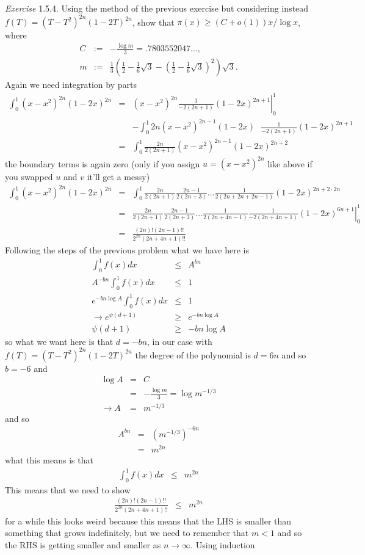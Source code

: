 \documentclass[aps,preprint,preprintnumbers,nofootinbib,showpacs,prd]{revtex4-1}
\newcommand{\nbea}{\begin{eqnarray*}}
\newcommand{\neea}{\end{eqnarray*}}
\begin{document}
{\it Exercise} 1.5.4. Using the method of the previous exercise but considering instead $f(T) = (T - T^2)^{2n} (1 - 2T)^{2n}$, show that $\pi(x) \ge (C + o(1))x/ \log x$, where
%
\nbea
C & := & - \frac{\log m}{3} = .7803552047 \dots , \\
m & := & \frac{1}{3} \left( \frac{1}{2} - \frac{1}{6}\sqrt{3} - \left( \frac{1}{2} - \frac{1}{6}\sqrt{3} \right )^2 \right ) \sqrt{3}.
\neea
%
Again we need integration by parts
%
\nbea
\int_0^1 (x - x^2)^{2n} (1-2x)^{2n} & = & \left. (x-x^2)^{2n}\frac{1}{-2(2n+1)} (1-2x)^{2n+1}\right |_0^1 \\
&& - \int_0^1 2n (x - x^2)^{2n-1} (1 - 2x) ~~~ \frac{1}{-2(2n+1)} (1 - 2x)^{2n+1} \\
& = & \int_0^1 \frac{2n}{2(2n+1)} (x - x^2)^{2n-1} (1 - 2x)^{2n+2}
\neea
%
the boundary terms is again zero (only if you assign $u=(x-x^2)^{2n}$ like above if you swapped $u$ and $v$ it'll get a messy)
%
\nbea
\int_0^1 (x - x^2)^{2n} (1-2x)^{2n} & = & \int_0^1 \frac{2n}{2(2n+1)} \frac{2n-1}{2(2n+3)} \dots \frac{1}{2(2n + 2n + 2n - 1)} (1 - 2x)^{2n + 2\cdot2n} \\
& = & \left. \frac{2n}{2(2n+1)} \frac{2n-1}{2(2n+3)} \dots \frac{1}{2(2n + 4n - 1)} \frac{1}{-2(2n + 4n + 1)} (1-2x)^{6n+1}\right|_0^1 \\
& = & \frac{(2n)!(2n-1)!!}{2^{2n} (2n + 4n + 1)!!}
\neea
%
Following the steps of the previous problem what we have here is
%
\nbea
\int_0^1 f(x) dx & \le & A^{bn} \\
A^{-bn}\int_0^1 f(x) dx & \le & 1 \\
e^{-bn\log A}\int_0^1 f(x) dx & \le & 1 \\
\to e^{\psi(d+1)} & \ge & e^{-bn\log A} \\
\psi(d + 1) & \ge & -bn\log A
\neea
%
so what we want here is that $d = -bn$, in our case with $f(T) = (T - T^2)^{2n}(1 - 2T)^{2n}$ the degree of the polynomial is $d = 6n$ and so $b = -6$ and 
%
\nbea
\log A & = & C \\
& = & -\frac{\log m}{3} = \log m^{-1/3} \\
\to A & = & m^{-1/3}
\neea
%
and so
%
\nbea
A^{bn} & = & \left( m^{-1/3}\right )^{-6n} \\
& = & m^{2n}
\neea
%
what this means is that
%
\nbea
\int_0^1 f(x) dx & \le & m^{2n}
\neea
%
This means that we need to show 
%
\nbea
\frac{(2n)!(2n-1)!!}{2^{2n} (2n + 4n + 1)!!} & \le & m^{2n}
\neea
%
for a while this looks weird because this means that the LHS is smaller than something that grows indefinitely, but we need to remember that $m < 1$ and so the RHS is getting smaller and smaller as $n\to\infty$. Using induction
\end{document}
